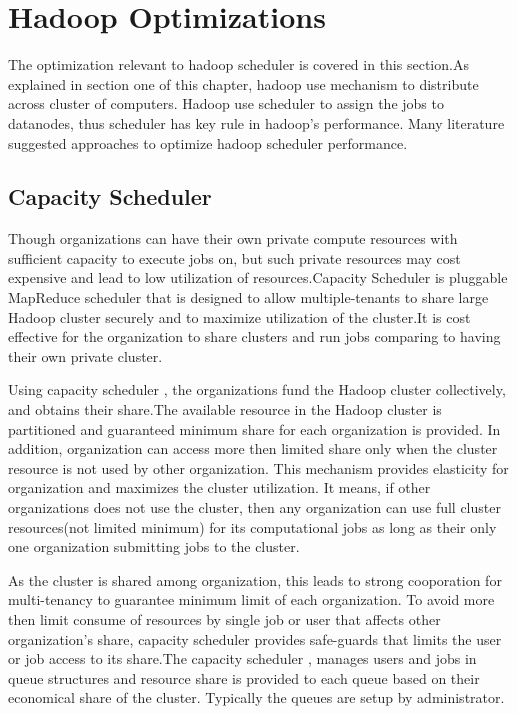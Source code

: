 

\section{Hadoop Optimizations}

 The optimization relevant to hadoop scheduler is covered in this section.As explained in section one of this chapter, hadoop use mechanism to distribute across cluster of computers. Hadoop use scheduler to assign the jobs to datanodes, thus scheduler has key rule in hadoop's performance.  Many literature suggested approaches to optimize hadoop scheduler performance.
 
 \subsection{Capacity Scheduler}
 
Though organizations can have their own private compute resources with sufficient capacity to execute jobs on, but such private resources may cost expensive and lead to low utilization of resources.Capacity Scheduler is pluggable MapReduce scheduler that is designed to allow multiple-tenants to share large Hadoop cluster securely and to maximize utilization of the cluster.It is cost effective for the organization to share clusters and run jobs comparing to having their own private cluster. 

 Using capacity scheduler , the organizations fund the Hadoop cluster collectively, and obtains their share.The available resource in the Hadoop cluster is partitioned and  guaranteed  minimum share for each organization is provided. In addition, organization can access more then limited share only when the cluster resource is not used by other organization. This mechanism provides elasticity for organization and maximizes the cluster utilization. It means, if other organizations does not use the cluster, then any organization can use full cluster resources(not limited minimum) for its computational jobs as long as their only one organization submitting jobs to the cluster.
 
 As the cluster is shared among organization, this leads to strong cooporation for multi-tenancy to guarantee minimum limit of each organization. To avoid more then limit consume of resources  by single job or user that affects other organization's share, capacity scheduler provides safe-guards that limits the user or job access to its share.The capacity scheduler , manages users and jobs in queue structures and resource share is provided to each queue based on their economical share of the cluster. Typically the queues are setup by administrator.
 
